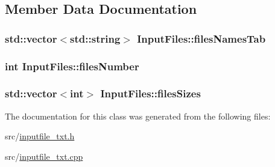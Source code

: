 \subsection{Member Data Documentation}
\hypertarget{class_input_files_abbdfa73eda4af470d13c3d54a8665a0e}{}
\subsubsection[{files\+Names\+Tab}]{\setlength{\rightskip}{0pt plus 5cm}std\+::vector$<$std\+::string$>$ Input\+Files\+::files\+Names\+Tab\hspace{0.3cm}{\ttfamily [private]}}\label{class_input_files_abbdfa73eda4af470d13c3d54a8665a0e}
\hypertarget{class_input_files_aa1c405cc71b38dae8dbabc3cac0925e4}{}
\subsubsection[{files\+Number}]{\setlength{\rightskip}{0pt plus 5cm}int Input\+Files\+::files\+Number\hspace{0.3cm}{\ttfamily [private]}}\label{class_input_files_aa1c405cc71b38dae8dbabc3cac0925e4}
\hypertarget{class_input_files_a72f1784ee9848a58c413e8da2529b70d}{}
\subsubsection[{files\+Sizes}]{\setlength{\rightskip}{0pt plus 5cm}std\+::vector$<$int$>$ Input\+Files\+::files\+Sizes\hspace{0.3cm}{\ttfamily [private]}}\label{class_input_files_a72f1784ee9848a58c413e8da2529b70d}


The documentation for this class was generated from the following files\+:\begin{DoxyCompactItemize}
\item 
src/\hyperlink{inputfile__txt_8h}{inputfile\+\_\+txt.\+h}\item 
src/\hyperlink{inputfile__txt_8cpp}{inputfile\+\_\+txt.\+cpp}\end{DoxyCompactItemize}
